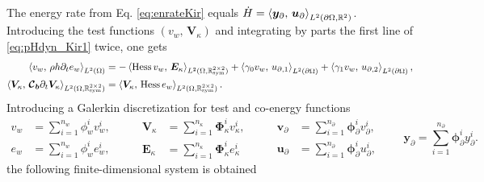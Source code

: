 The energy rate from Eq. \eqref{eq:enrateKir} equals $\dot{H} = \inner[L^2(\partial\Omega, \mathbb{R}^2)]{\bm{y}_\partial}{\bm{u}_\partial}$. Introducing the test functions $(v_w,\, \bm{V}_\kappa)$ and integrating by parts the first line of \eqref{eq:pHdyn_Kir1} twice, one gets 
\begin{equation}\label{eq:weak_kir_Hess}
\begin{aligned}
\inner[L^2(\Omega)]{v_w}{\rho h \partial_t e_w} &= -\inner[L^2(\Omega, \mathbb{R}^{2\times 2}_{\text{sym}})]{\Hess v_w}{\bm{E}_\kappa} + \inner[L^2(\partial\Omega)]{\gamma_0 v_w}{{u}_{\partial, 1}} + \inner[L^2(\partial\Omega)]{\gamma_1 v_w}{{u}_{\partial, 2}}, \\
\inner[L^2(\Omega, \mathbb{R}^{2\times 2}_{\text{sym}})]{\bm{V}_\kappa}{\bm{\mathcal{C}_b} \partial_t \bm{V}_\kappa} &= \inner[L^2(\Omega, \mathbb{R}^{2\times 2}_{\text{sym}})]{\bm{V}_\kappa}{\Hess e_w}. \\
\end{aligned}
\end{equation}
Introducing a Galerkin discretization for test and co-energy functions
\begin{equation}
\begin{aligned}
v_w &= \sum_{i = 1}^{n_w} \phi_w^i v_w^i, \\
e_w &= \sum_{i = 1}^{n_w} \phi_w^i e_w^i,
\end{aligned} \qquad
\begin{aligned}
\bm{V}_\kappa &= \sum_{i = 1}^{n_\kappa} \bm\Phi_\kappa^i v_\kappa^i, \\
\bm{E}_\kappa &= \sum_{i = 1}^{n_\kappa} \bm\Phi_\kappa^i e_\kappa^i
\end{aligned} \qquad
\begin{aligned}
\bm{v}_\partial &= \sum_{i = 1}^{n_\partial} \bm\phi_\partial^i v_\partial^i, \\
\bm{u}_\partial  &= \sum_{i = 1}^{n_\partial} \bm\phi_\partial^i u_\partial^i,
\end{aligned} \qquad
\bm{y}_\partial = \sum_{i = 1}^{n_\partial} \bm\phi_\partial^i y_\partial^i.
\end{equation} 
the following finite-dimensional system is obtained
